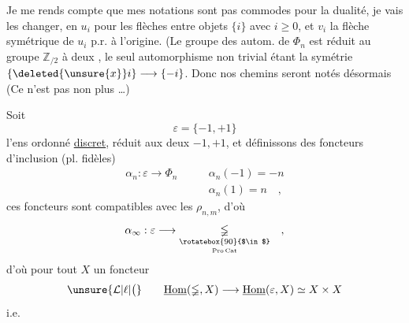 Je me rends compte que mes notations  sont pas commodes pour la dualité, je vais les changer, en $u_i$ pour les flèches entre objets $\{i\}$ avec $i\geq0$,  et $v_i$ la flèche symétrique de $u_i$ p.r. à l'origine. (Le groupe des autom. de $\Phi_n$ est réduit au groupe $\mathbb Z_{/2}$ à deux , le seul automorphisme non trivial étant la symétrie $\{\deleted{\unsure{x}}i\}\longrightarrow\{-i\}$. Donc nos  chemins seront notés désormais
(Ce n'est pas non plus \ldots)

 Soit 
\[
\varepsilon=\{-1,+1\}
\]
l'ens ordonné \uline{discret}, réduit aux deux  $-1,+1$, et définissons des foncteurs d'inclusion (pl. fidèles)
\[
\begin{aligned}
\alpha_n:\varepsilon\longrightarrow\Phi_n\qquad &\alpha_n(-1)=-n\\
&\alpha_n(1)=n\quad,
\end{aligned}
\]
ces foncteurs sont compatibles avec les $\rho_{n,m}$, d'où
\[
\alpha_\infty:\varepsilon\longrightarrow\underset{\underset{\mathrm{Pro\,Cat}}{\rotatebox{90}{$\in$}}}{\mathbb{\Phi}}\quad,
\]
d'où pour tout $X$ un foncteur
\[
\unsure{\mathcal L|\ell|\bigl(}\qquad\underline{\mathrm{Hom}}(\mathbb{\Phi},X)\longrightarrow\underline{\mathrm{Hom}}(\varepsilon,X)\simeq X\times X
\]
i.e.

